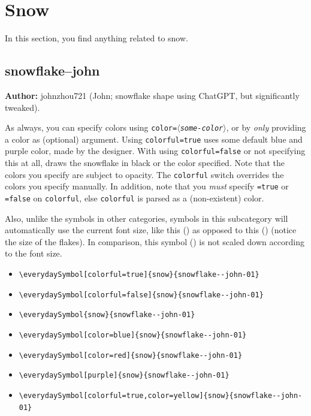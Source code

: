 \documentclass{article}
\newcommand{\meta}[1]{$\langle$\textit{\textrm{#1}}$\rangle$}
\begin{document}
\section{Snow}

In this section, you find anything related to snow. 

\subsection{snowflake--john}

\textbf{Author:} johnzhou721 (John; snowflake shape using ChatGPT, but significantly tweaked).

As always, you can specify colors using \texttt{color=\meta{some-color}}, or by \emph{only} providing a color as (optional) argument. Using \texttt{colorful=true} uses some default blue and purple color, made by the designer.  With using \texttt{colorful=false} or not specifying this at all, draws the snowflake in black or the color specified. Note that the colors you specify are subject to opacity. The \texttt{colorful} switch overrides the colors you specify manually. In addition, note that you \emph{must} specify \texttt{=true} or \texttt{=false} on \texttt{colorful}, else \texttt{colorful} is parsed as a (non-existent) color.

Also, unlike the symbols in other categories, symbols in this subcategory will automatically use the current font size, {\large like this ()} {\tiny as opposed to this ()} (notice the size of the flakes). In comparison, {\tiny this symbol () is not scaled down according to the font size}.

\begin{itemize}
  \item \verb|\everydaySymbol[colorful=true]{snow}{snowflake--john-01}| \dotfill\ 
  \item \verb|\everydaySymbol[colorful=false]{snow}{snowflake--john-01}| \dotfill\ 
  \item \verb|\everydaySymbol{snow}{snowflake--john-01}| \dotfill\ 
  \item \verb|\everydaySymbol[color=blue]{snow}{snowflake--john-01}| \dotfill\ 
  \item \verb|\everydaySymbol[color=red]{snow}{snowflake--john-01}| \dotfill\ 
  \item \verb|\everydaySymbol[purple]{snow}{snowflake--john-01}| \dotfill\ 
  \item \verb|\everydaySymbol[colorful=true,color=yellow]{snow}{snowflake--john-01}| \dotfill\ 
\end{itemize}
\end{document}
